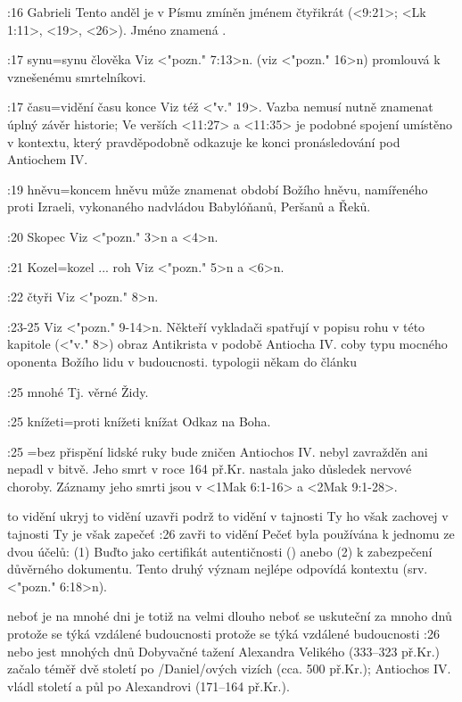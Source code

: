 :16 {Gabrieli} Tento anděl je v Písmu zmíněn jménem čtyřikrát (<9:21>; <Lk 1:11>, <19>, <26>). Jméno znamená .

:17 {synu}={synu člověka} Viz <"pozn." 7:13>n.  (viz <"pozn." 16>n) promlouvá k vznešenému smrtelníkovi. 

:17 {času}={vidění času konce} Viz též <"v." 19>. Vazba nemusí nutně znamenat úplný závěr historie; Ve verších <11:27> a <11:35> je podobné spojení umístěno v kontextu, který pravděpodobně odkazuje ke konci pronásledování pod Antiochem IV.

:19 {hněvu}={koncem hněvu}  může znamenat období Božího hněvu, namířeného proti   Izraeli, vykonaného nadvládou Babylóňanů, Peršanů a Řeků. 

:20 {Skopec} Viz <"pozn." 3>n a <4>n.

:21 {Kozel}={kozel ... roh} Viz <"pozn." 5>n a <6>n.

:22 {čtyři} Viz  <"pozn." 8>n.

:23-25 {} Viz  <"pozn." 9-14>n. Někteří vykladači spatřují v popisu rohu v této kapitole (<"v." 8>)
obraz Antikrista v podobě Antiocha IV. coby typu mocného oponenta Božího lidu v budoucnosti.  
\dopsat typologii někam do článku

:25 {mnohé} Tj. věrné Židy.

:25 {knížeti}={proti knížeti knížat} Odkaz na Boha.

:25 {}={bez přispění lidské ruky bude zničen} Antiochos IV. nebyl zavražděn ani nepadl v bitvě. Jeho smrt v roce 164 př.Kr. nastala jako důsledek nervové choroby. Záznamy jeho smrti jsou v <1Mak 6:1-16> a <2Mak 9:1-28>.

    {to vidění ukryj}  %
    {to vidění uzavři}  %
    {podrž to vidění v tajnosti}  %
    {Ty ho však zachovej v tajnosti}  %
    {Ty je však zapečeť}  %
:26 {zavři to vidění} Pečeť byla používána k jednomu ze dvou účelů: (1) Buďto jako certifikát autentičnosti () anebo (2) k zabezpečení  důvěrného dokumentu. Tento druhý význam nejlépe odpovídá kontextu (srv. <"pozn." 6:18>n).


    {neboť je na mnohé dni}      {je totiž na velmi dlouho}      {neboť se uskuteční za mnoho dnů}      {protože se týká vzdálené budoucnosti}      {protože se týká vzdálené budoucnosti}    
:26 {nebo jest mnohých dnů} Dobyvačné tažení Alexandra Velikého (333--323 př.Kr.) začalo téměř dvě století po \x/Daniel/ových vizích (cca. 500 př.Kr.); Antiochos IV. vládl století a půl po Alexandrovi (171--164 př.Kr.). 

